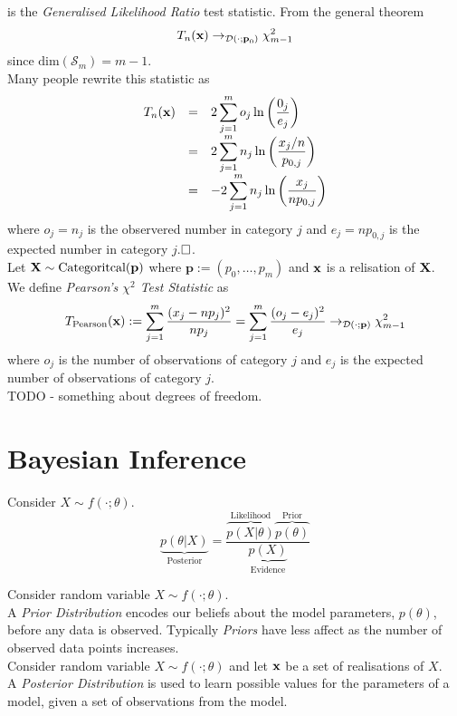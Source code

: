 \documentclass[11pt,a4paper]{article}
\begin{document}
is the \textit{Generalised Likelihood Ratio} test statistic. From the general theorem
$$T_n(\textbf{x})\to_{\mathcal{D}(\cdot;\textbf{p}_0)}\chi^2_{m-1}$$
since $\text{dim}(\mathcal{S}_m)=m-1$.\\
Many people rewrite this statistic as
\[\begin{array}{rcl}
T_n(\textbf{x})&=&{\displaystyle2\sum_{j=1}^mo_j\ln\left(\frac{0_j}{e_j}\right)}\\
&=&{\displaystyle2\sum_{j=1}^mn_j\ln\left(\frac{x_j/n}{p_{0,j}}\right)}\\
&=&{\displaystyle-2\sum_{j=1}^mn_j\ln\left(\frac{x_j}{np_{0,j}}\right)}
\end{array}\]
where $o_j=n_j$ is the observered number in category $j$ and $e_j=np_{0,j}$ is the expected number in category $j$.$\hfill\square$.\\

Let $\textbf{X}\sim\text{Categoritcal}(\textbf{p})$ where $\textbf{p}:=(p_0,\dots,p_m)$ and $\textbf{x}$ is a relisation of $\textbf{X}$.\\
We define \textit{Pearson's $\chi^2$ Test Statistic}  as
$$T_\text{Pearson}(\textbf{x}):=\sum_{j=1}^m\frac{(x_j-np_{j})^2}{np_{j}}=\sum_{j=1}^m\frac{(o_j-e_j)^2}{e_j}\to_{\mathcal{D}(\cdot;\textbf{p})}\chi^2_{m-1}$$
where $o_j$ is the number of observations of category $j$ and $e_j$ is the expected number of observations of category $j$.\\
\nb TODO - something about degrees of freedom.

\section{Bayesian Inference}

Consider $X\sim f(\cdot;\theta)$.
$$\underbrace{p(\theta|X)}_\text{Posterior}=\dfrac{\overbrace{p(X|\theta)}^\text{Likelihood}\overbrace{p(\theta)}^\text{Prior}}{\underbrace{p(X)}_\text{Evidence}}$$

Consider random variable $X\sim f(\cdot;\theta)$.\\
A \textit{Prior Distribution} encodes our beliefs about the model parameters, $p(\theta)$, before any data is observed. Typically \textit{Priors} have less affect as the number of observed data points increases.\\

Consider random variable $X\sim f(\cdot;\theta)$ and let $\textbf{x}$ be a set of realisations of $X$.\\
A \textit{Posterior Distribution} is used to learn possible values for the parameters of a model, given a set of observations from the model.\\
\end{document}
